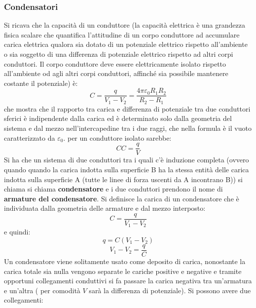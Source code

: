 \documentclass[a4paper,12pt, oneside]{book}
\begin{document}
\subsubsection{Condensatori}
Si ricava che la capacità di un conduttore (la capacità elettrica è una grandezza fisica scalare che quantifica l'attitudine di un corpo conduttore ad accumulare carica elettrica qualora sia dotato di un potenziale elettrico rispetto all'ambiente o sia soggetto di una differenza di potenziale elettrico rispetto ad altri corpi conduttori.  Il corpo conduttore deve essere elettricamente isolato rispetto all'ambiente od agli altri corpi conduttori, affinché sia possibile mantenere costante il potenziale) è:
$$C=\frac{q}{V_1-V_2}=\frac{4\pi\varepsilon_0R_1R_2}{R_2-R_1}$$
che mostra che il rapporto tra carica e differenza di potenziale tra due conduttori sferici è indipendente dalla carica ed è determinato solo dalla geometria del sistema e dal mezzo nell'intercapedine tra i due raggi, che nella formula è il vuoto caratterizzato da $\varepsilon_0$. 
per un conduttore isolato sarebbe:
$$CC=\frac{q}{V}$$
Si ha che un sistema di due conduttori tra i quali c'è induzione completa (ovvero quando quando la carica indotta sulla superficie B ha la stessa entità delle carica indotta sulla superficie A (tutte le linee di forza uscenti da A incontrano B)) si chiama si chiama \textbf{condensatore} e i due conduttori prendono il nome di \textbf{armature del condensatore}. Si definisce la carica di un condensatore che è individuata dalla geometria delle armature e dal mezzo interposto:
$$C=\frac{q}{V_1-V_2}$$
e quindi:
$$q=C(V_1-V_2)$$
$$V_1-V_2=\frac{q}{C}$$
Un condensatore viene solitamente usato come deposito di carica, nonostante la carica totale sia nulla vengono separate le cariche positive e negative e tramite opportuni collegamenti conduttivi si fa passare la carica negativa tra un'armatura e un'altra ( per comodità $V$ sarà la differenza di potenziale). Si possono avere due collegamenti:
\end{document}
